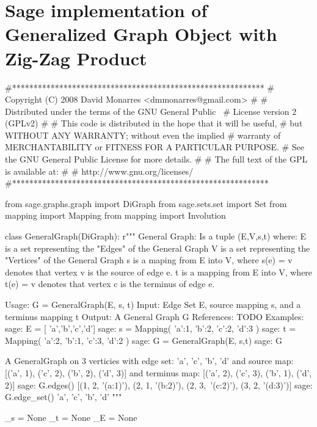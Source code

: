 \section{Sage implementation of Generalized Graph Object with Zig-Zag Product}
\label{app:nets}
\begin{sageblock}
#***********************************************************
#  Copyright (C) 2008 David Monarres <dmmonarres@gmail.com>
#
#  Distributed under the terms of the GNU General Public \
#  License version 2 (GPLv2)
#
#  This code is distributed in the hope that it will be useful,
#  but WITHOUT ANY WARRANTY; without even the implied 
#  warranty of MERCHANTABILITY or FITNESS FOR A PARTICULAR PURPOSE.  
#  See the GNU General Public License for more details.
#
#  The full text of the GPL is available at:
#
#                  http://www.gnu.org/licenses/
#************************************************************

from sage.graphs.graph import DiGraph
from sage.sets.set import Set
from mapping import Mapping
from mapping import Involution

class GeneralGraph(DiGraph):
    r"""
    General Graph: Is a tuple (E,V,s,t) where:
        E is a set representing the "Edges" of the 
        General Graph
        V is a set representing the "Vertices" of the 
        General Graph
        s is a maping from E into V, where s(e) = v 
        denotes that vertex
        v is the source of edge e.
        t is a mapping from E into V, where t(e) = v 
        denotes that vertex c is the terminus of edge e.

    Usage: G = GeneralGraph(E, s, t)
    Input: Edge Set E, source mapping s, and a 
    terminus mapping t
    Output: A General Graph G
    References: TODO
    Examples:
        sage: E = [ 'a','b','c','d']
        sage: s = Mapping({ 'a':1, 'b':2, 'c':2, 'd':3 })
        sage: t = Mapping({ 'a':2, 'b':1, 'c':3, 'd':2 })
        sage: G = GeneralGraph(E, s,t)
        sage: G
    
        A GeneralGraph on 3 verticies with edge set:
            {'a', 'c', 'b', 'd'}
        and source map:
            [('a', 1), ('c', 2), ('b', 2), ('d', 3)]
        and terminus map:
            [('a', 2), ('c', 3), ('b', 1), ('d', 2)]
        sage: G.edges()
            [(1, 2, '(a:1)'), (2, 1, '(b:2)'), (2, 3,\
            '(c:2)'), (3, 2, '(d:3)')]
        sage: G.edge_set()
            {'a', 'c', 'b', 'd'}
    """

    _s = None
    _t = None
    _E = None


\end{sageblock}
